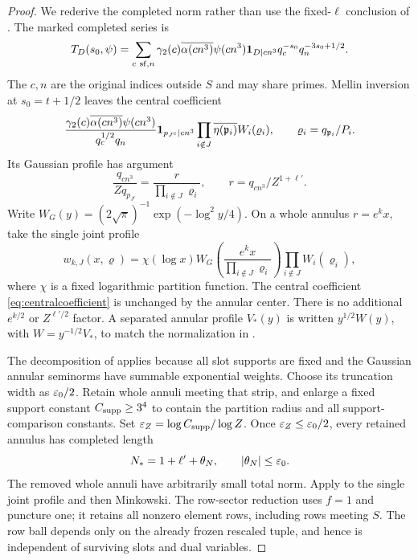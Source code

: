 \begin{proof}
We rederive the completed norm rather than use the fixed-$\ell$ conclusion of . The marked completed series is
\[
 T_D(s_0,\psi)=\sum_{c\ \mathrm{sf},n}
 \gamma_2(c)\overline{\alpha(cn^3)}\psi(cn^3)
 \mathbf 1_{D\mid cn^3}q_c^{-s_0}q_n^{-3s_0+1/2}.
\]
The $c,n$ are the original indices outside $S$ and may share primes. Mellin inversion at $s_0=t+1/2$ leaves the central coefficient
\begin{equation}\label{eq:centralcoefficient}
 \frac{\gamma_2(c)\overline{\alpha(cn^3)}\psi(cn^3)}{q_c^{1/2}q_n}
 \mathbf 1_{p_{J^c}\mid cn^3}\prod_{i\notin J}\overline{\eta(\mathfrak p_i)}W_i(\varrho_i),
 \qquad\varrho_i=q_{\mathfrak p_i}/P_i.
\end{equation}
Its Gaussian profile has argument
\[
 \frac{q_{cn^3}}{Zq_{p_{J^c}}}=\frac{r}{\prod_{i\notin J}\varrho_i},
 \qquad r=q_{cn^3}/Z^{1+\ell'}.
\]
Write $W_G(y)=(2\sqrt\pi)^{-1}\exp(-\log^2y/4)$. On a whole annulus $r=e^kx$, take the single joint profile
\[
 w_{k,J}(x,\boldsymbol\varrho)=\chi(\log x)
 W_G\!\left(\frac{e^kx}{\prod_{i\notin J}\varrho_i}\right)
 \prod_{i\notin J}W_i(\varrho_i),
\]
where $\chi$ is a fixed logarithmic partition function. The central coefficient \eqref{eq:centralcoefficient} is unchanged by the annular center. There is no additional $e^{k/2}$ or $Z^{\ell'/2}$ factor. A separated annular profile $V_*(y)$ is written $y^{1/2}W(y)$, with $W=y^{-1/2}V_*$, to match the normalization in .

The decomposition of  applies because all slot supports are fixed and the Gaussian annular seminorms have summable exponential weights. Choose its truncation width as $\varepsilon_0/2$. Retain whole annuli meeting that strip, and enlarge a fixed support constant $C_{\rm supp}\ge3^4$ to contain the partition radius and all support-comparison constants. Set $\varepsilon_Z=\log C_{\rm supp}/\log Z$. Once $\varepsilon_Z\le\varepsilon_0/2$, every retained annulus has completed length
\[
 N_*=1+\ell'+\theta_N,\qquad |\theta_N|\le\varepsilon_0.
\]
The removed whole annuli have arbitrarily small total norm. Apply  to the single joint profile and then Minkowski. The row-sector reduction  uses $f=1$ and puncture one; it retains all nonzero element rows, including rows meeting $S$. The row ball depends only on the already frozen rescaled tuple, and hence is independent of surviving slots and dual variables.


\end{proof}
